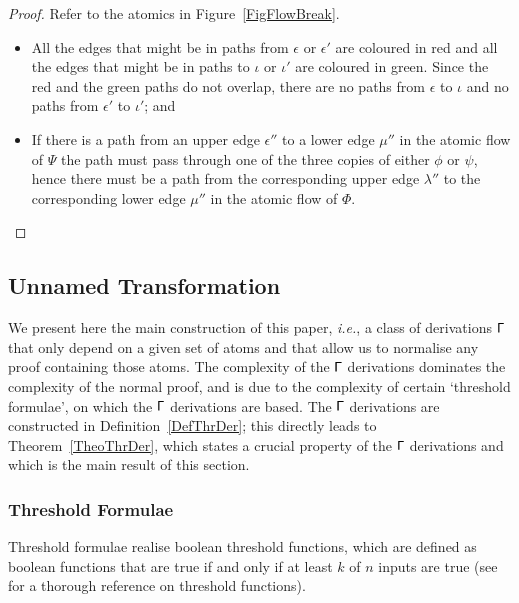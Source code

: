 \begin{proof}
Refer to the atomics in Figure~\ref{FigFlowBreak}.
\begin{itemize}
	\item All the edges that might be in paths from $\epsilon$ or $\epsilon'$ are coloured in red and all the edges that might be in paths to $\iota$ or $\iota'$ are coloured in green. Since the red and the green paths do not overlap, there are no paths from $\epsilon$ to $\iota$ and no paths from $\epsilon'$ to $\iota'$; and
	\item If there is a path from an upper edge $\epsilon''$ to a lower edge $\mu''$ in the atomic flow of $\Psi$ the path must pass through one of the three copies of either $\phi$ or $\psi$, hence there must be a path from the corresponding upper edge $\lambda''$ to the corresponding lower edge $\mu''$ in the atomic flow of $\Phi$.
\end{itemize}
\end{proof}

\subsection{Unnamed Transformation}


We present here the main construction of this paper, \emph{i.e.}, a class of derivations $\mathsf\Gamma$ that only depend on a given set of atoms and that allow us to normalise any proof containing those atoms. The complexity of the $\mathsf\Gamma$ derivations dominates the complexity of the normal proof, and is due to the complexity of certain `threshold formulae', on which the $\mathsf\Gamma$ derivations are based. The $\mathsf\Gamma$ derivations are constructed in Definition~\ref{DefThrDer}; this directly leads to Theorem~\ref{TheoThrDer}, which states a crucial property of the $\mathsf\Gamma$ derivations and which is the main result of this section.

\subsubsection{Threshold Formulae}

Threshold formulae realise boolean threshold functions, which are defined as boolean functions that are true if and only if at least $k$ of $n$ inputs are true (see \cite{Wege:87:The-Comp:vn} for a thorough reference on threshold functions). 


